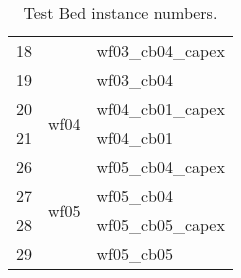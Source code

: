 \begin{table}[!htbp]
\begin{tabular}{lcl}
18     &                               & wf03\_cb04\_capex \\
19     &                               & wf03\_cb04        \\ \hline
20     & \multirow{2}{*}{wf04}         & wf04\_cb01\_capex \\
21     &                               & wf04\_cb01        \\ \hline
26     & \multirow{4}{*}{wf05}         & wf05\_cb04\_capex \\
27     &                               & wf05\_cb04        \\
28     &                               & wf05\_cb05\_capex \\
29     &                               & wf05\_cb05        \\ \hline
\end{tabular}
\caption {Test Bed instance numbers.}
\end{table}